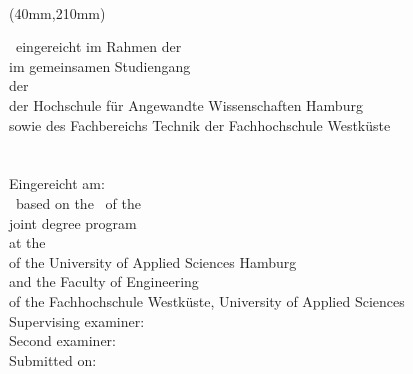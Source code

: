 \title{\Title}   				%
\author{\TheStudent}		%

\newpage
\thispagestyle{empty}

{
\hfuzz=20pt					%
\selectfont

\vspace*{1cm}
\begin{minipage}[b]{\textwidth}
	\begin{center}
		\fontsize{14pt}{20pt}\selectfont
		\TheStudent \\[1.5cm]
		\fontsize{18pt}{20pt}\selectfont
		\Title
	\end{center}
\end{minipage}

\begin{textblock*}{\textwidth}(40mm,210mm)
	\begin{minipage}[b]{\textwidth}
		\fontsize{12pt}{14pt}\selectfont
		\DE
		{
			\ThesisKind\ eingereicht im Rahmen der \ExamKind \\	
			im gemeinsamen Studiengang \textit{\DegreeName} \\
			der \FacultyDE \\
			der Hochschule für Angewandte Wissenschaften Hamburg\\
			sowie des Fachbereichs Technik der Fachhochschule Westküste\\[1em]
			 \TheSupervisor \\
			 \TheSecondExaminer \\[1em]
			Eingereicht am: \DateOfSubmission \\
		}
		{
			\ThesisKind\ based on the \ExamKind\ of the\\
			joint degree program \textit{\DegreeName} \\
			at the \FacultyEN \\
			of the University of Applied Sciences Hamburg\\
			and the Faculty of Engineering\\
			of the Fachhochschule Westküste, University of Applied Sciences\\[1em]
			Supervising examiner: \TheSupervisor \\
			Second examiner: \TheSecondExaminer \\[1em]
			Submitted on: \DateOfSubmission \\
		}
	\end{minipage}
\end{textblock*}
}
